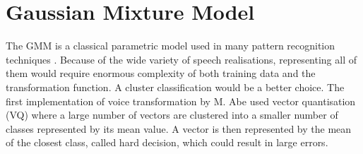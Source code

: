 






\section{Gaussian Mixture Model} %
\label{sec:gaussian_mixture_model}
The GMM is a classical parametric model used in many pattern recognition techniques \cite{stylianou98}. Because of the wide variety of speech realisations, representing all of them would require enormous complexity of both training data and the transformation function. A cluster classification would be a better choice. The first implementation of voice transformation by M. Abe \cite{abe88} used vector quantisation (VQ) \cite{gray84} where a large number of vectors are clustered into a smaller number of classes represented by its mean value. A vector is then represented by the mean of the closest class, called hard decision, which could result in large errors. 

